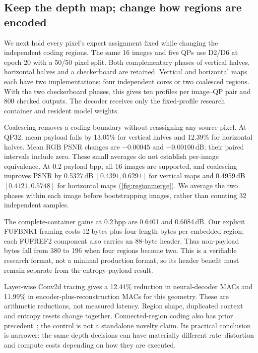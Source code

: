 \subsection{Keep the depth map; change how regions are encoded}
We next hold every pixel's expert assignment fixed while changing the
independent coding regions. The same 16 images and five QPs use D2/D6
at epoch 20 with a 50/50 pixel split. Both complementary phases of vertical
halves, horizontal halves and a checkerboard are retained. Vertical and
horizontal maps each have two implementations: four independent cores or
two coalesced regions. With the two checkerboard phases, this gives ten
profiles per image--QP pair and 800 checked outputs. The decoder receives
only the fixed-profile research container and resident model weights.

Coalescing removes a coding boundary without reassigning any source pixel.
At QP32, mean payload falls by 13.05\% for vertical halves and 12.39\% for
horizontal halves. Mean RGB PSNR changes are $-0.00045$ and $-0.00100$\,dB;
their paired intervals include zero. These small averages do not establish
per-image equivalence. At 0.2 payload bpp, all 16 images are supported, and
coalescing improves PSNR by 0.5327\,dB $[0.4391,0.6291]$ for vertical maps
and 0.4959\,dB $[0.4121,0.5748]$ for horizontal maps
(\cref{fig:regionmerge}). We average the two phases within each image
before bootstrapping images, rather than counting 32 independent samples.

The complete-container gains at 0.2\,bpp are 0.6401 and 0.6084\,dB.
Our explicit FUFBNK1 framing costs 12 bytes plus four length bytes per
embedded region; each FUFREF2 component also carries an 88-byte header.
Thus non-payload bytes fall from 380 to 196 when four regions become two.
This is a verifiable research format, not a minimal production format, so
its header benefit must remain separate from the entropy-payload result.

Layer-wise Conv2d tracing gives a 12.44\% reduction in neural-decoder MACs
and 11.99\% in encoder-plus-reconstruction MACs for this geometry. These are
arithmetic reductions, not measured latency. Region shape, duplicated context
and entropy resets change together. Connected-region coding also has prior
precedent~\cite{blard2026spatial}; the control is not a standalone novelty
claim. Its practical conclusion is narrower: the same depth decisions can
have materially different rate--distortion and compute costs depending on
how they are executed.

